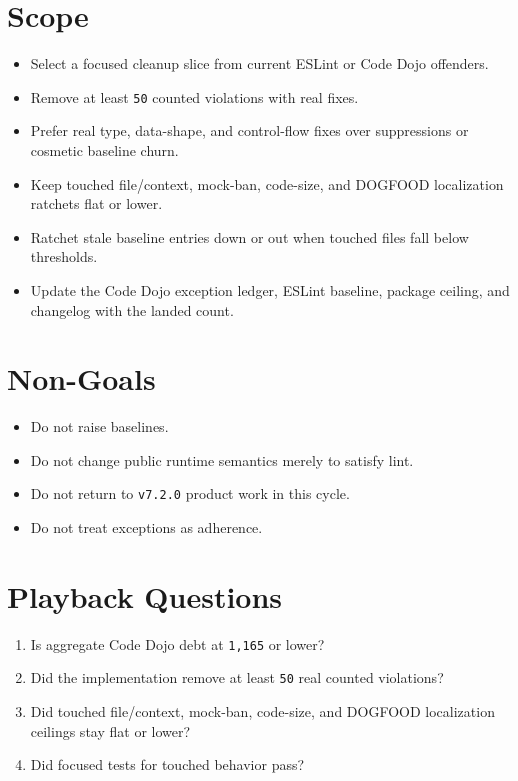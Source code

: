 \section{Scope}\label{record-232-scope}

\begin{itemize}
\tightlist
\item
  Select a focused cleanup slice from current ESLint or Code Dojo offenders.
\item
  Remove at least \texttt{5\allowbreak{}0} counted violations with real fixes.
\item
  Prefer real type, data-shape, and control-flow fixes over suppressions or cosmetic baseline churn.
\item
  Keep touched file/context, mock-ban, code-size, and DOGFOOD localization ratchets flat or lower.
\item
  Ratchet stale baseline entries down or out when touched files fall below thresholds.
\item
  Update the Code Dojo exception ledger, ESLint baseline, package ceiling, and changelog with the landed count.
\end{itemize}

\section{Non-Goals}\label{record-232-non-goals}

\begin{itemize}
\tightlist
\item
  Do not raise baselines.
\item
  Do not change public runtime semantics merely to satisfy lint.
\item
  Do not return to \texttt{v\allowbreak{}7\allowbreak{}.\allowbreak{}2\allowbreak{}.\allowbreak{}0} product work in this cycle.
\item
  Do not treat exceptions as adherence.
\end{itemize}

\section{Playback Questions}\label{record-232-playback-questions}

\begin{enumerate}
\def\labelenumi{\arabic{enumi}.}
\tightlist
\item
  Is aggregate Code Dojo debt at \texttt{1\allowbreak{},\allowbreak{}1\allowbreak{}6\allowbreak{}5} or lower?
\item
  Did the implementation remove at least \texttt{5\allowbreak{}0} real counted violations?
\item
  Did touched file/context, mock-ban, code-size, and DOGFOOD localization ceilings stay flat or lower?
\item
  Did focused tests for touched behavior pass?
\end{enumerate}

